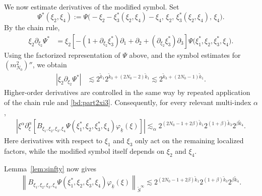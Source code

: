 \documentclass[UTF-8,reqno]{amsart}
\numberwithin{equation}{section}
\theoremstyle{definition}
\begin{document}
We now estimate derivatives of the modified symbol. Set
\[
\Psi^*(\xi_2,\xi_4)
:=
\Psi\bigl(
-\xi_2-\xi_3^*(\xi_2,\xi_4)-\xi_4,\,
\xi_2,\,
\xi_3^*(\xi_2,\xi_4),\,
\xi_4
\bigr).
\]
By the chain rule,
\begin{align*}
\xi_2\partial_{\xi_2}\Psi^*
&=
\xi_2
\left[
-(1+\partial_{\xi_2}\xi_3^*)\partial_1
+\partial_2
+(\partial_{\xi_2}\xi_3^*)\partial_3
\right]
\Psi
\bigl(
\xi_1^*,\xi_2,\xi_3^*,\xi_4
\bigr).
\end{align*}
Using   the factorized
representation of $\Psi$ above, and the symbol estimates for
$(m_{N_0}^2)''$, we obtain
\begin{align*}
\left|
\xi_2\partial_{\xi_2}\Psi^*
\right|
&\lesssim
2^{\widetilde k_1}
2^{\widetilde k_3
  +(2N_0-2)\widetilde k_1}
\lesssim
2^{\widetilde k_3
  +(2N_0-1)\widetilde k_1}.
\end{align*}
Higher-order derivatives are controlled in the same way by repeated
application of the chain rule and \eqref{bd:part2xi3}. Consequently,
for every relevant multi-index $\alpha$,
\begin{align}
\left|
\xi^\alpha\partial_\xi^\alpha
\left[
B_{\xi_1,\xi_2,\xi_3,\xi_4}
\Psi(\xi_1^*,\xi_2,\xi_3^*,\xi_4)
\varphi_{\underline{k}}(\xi)
\right]
\right|
\lesssim_\alpha
2^{(2N_0-1+2\beta)\widetilde{k}_1}
2^{(1+\beta)\widetilde{k}_3}
2^{\beta\widetilde{k}_4}.
\label{eq:q1-symbol-derivatives}
\end{align}
Here derivatives with respect to $\xi_1$ and $\xi_3$ only act on the
remaining localized factors, while the modified symbol itself depends
on $\xi_2$ and $\xi_4$.

Lemma~\ref{lem:sinfty} now gives
\begin{align}
\left\|
B_{\xi_1,\xi_2,\xi_3,\xi_4}
\Psi(\xi_1^*,\xi_2,\xi_3^*,\xi_4)
\varphi_{\underline{k}}(\xi)
\right\|_{\widetilde S^\infty}
\lesssim
2^{(2N_0-1+2\beta)\widetilde{k}_1}
2^{(1+\beta)\widetilde{k}_3}
2^{\beta\widetilde{k}_4}.
\label{eq:q1-sinfty}
\end{align}
\end{document}
